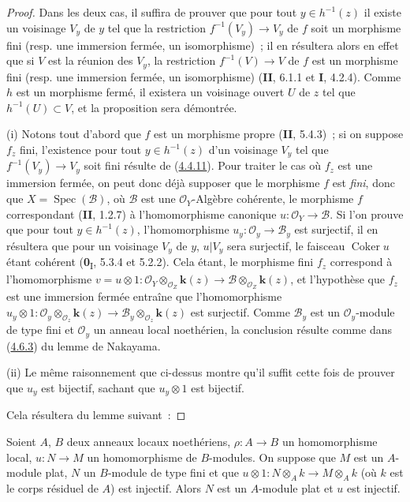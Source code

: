\begin{proof}
Dans les deux cas, il suffira de prouver que pour tout $y\in h^{-1}(z)$ il
existe un voisinage $V_y$ de $y$ tel que la restriction
$f^{-1}(V_y)\to V_y$ de $f$ soit un morphisme fini (resp. une immersion
fermée, un isomorphisme)~; il en résultera alors en effet que si $V$ est la
réunion des $V_y$, la restriction $f^{-1}(V)\to V$ de $f$ est un morphisme
fini (resp. une immersion fermée, un isomorphisme) (\textbf{II}, 6.1.1 et \textbf{I}, 4.2.4).
Comme $h$ est un morphisme fermé, il existera un voisinage ouvert $U$ de $z$
tel que $h^{-1}(U)\subset V$, et la proposition sera démontrée.

\noindent (i) Notons tout d'abord que $f$ est un morphisme propre
(\textbf{II}, 5.4.3)~; si on
suppose $f_z$ fini, l'existence pour tout
$y\in h^{-1}(z)$ d'un voisinage $V_y$ tel que $f^{-1}(V_y)\to V_y$ soit fini
résulte de (\hyperref[III.4.4.11-fr]{4.4.11}).
Pour traiter le cas où $f_z$ est une immersion fermée, on peut donc déjà
supposer que le morphisme $f$ est \emph{fini}, donc que
$X=\operatorname{Spec}(\mathcal B)$, où $\mathcal B$ est une
$\mathcal O_Y$-Algèbre cohérente, le morphisme $f$ correspondant (\textbf{II}, 1.2.7)
à l'homomorphisme canonique $u:\mathcal O_Y\to\mathcal B$. Si l'on prouve
que pour tout $y\in h^{-1}(z)$, l'homomorphisme
$u_y:\mathcal O_y\to\mathcal B_y$ est surjectif, il en résultera que pour un
voisinage $V_y$ de $y$, $u|V_y$ sera surjectif, le faisceau
$\operatorname{Coker}u$ étant cohérent (\textbf{0}\textsubscript{I}, 5.3.4 et 5.2.2).
Cela étant, le morphisme fini $f_z$ correspond à l'homomorphisme
$v=u\otimes1:
\mathcal O_Y\otimes_{\mathcal O_Z}\boldsymbol{k}(z)
\longrightarrow
\mathcal B\otimes_{\mathcal O_Z}\boldsymbol{k}(z)$,
et l'hypothèse que $f_z$ est une immersion fermée entraîne que
l'homomorphisme
$u_y\otimes1:
\mathcal O_y\otimes_{\mathcal O_z}\boldsymbol{k}(z)
\longrightarrow
\mathcal B_y\otimes_{\mathcal O_z}\boldsymbol{k}(z)$
est surjectif. Comme $\mathcal B_y$ est un $\mathcal O_y$-module de type
fini et $\mathcal O_y$ un anneau local noethérien, la conclusion résulte
comme dans (\hyperref[III.4.6.3-fr]{4.6.3}) du lemme de Nakayama.

\noindent (ii) Le même raisonnement que ci-dessus montre qu'il
suffit cette fois de prouver que $u_y$ est bijectif, sachant que
$u_y\otimes1$ est bijectif.

Cela résultera du lemme suivant~:
\end{proof}

\begin{lemma}[4.6.7.1]
\label{III.4.6.7.1-fr}
Soient $A$, $B$ deux anneaux locaux noethériens,
$\rho:A\to B$ un homomorphisme local, $u:N\to M$ un homomorphisme de
$B$-modules. On suppose que $M$ est un $A$-module plat, $N$ un $B$-module
de type fini et que
$u\otimes1:N\otimes_Ak\longrightarrow M\otimes_Ak$
(où $k$ est le corps résiduel de $A$) est injectif. Alors $N$ est un
$A$-module plat et $u$ est injectif.
\end{lemma}

